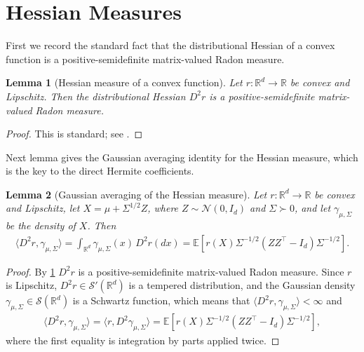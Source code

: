 \documentclass{article}
\newtheorem{lemma}[lemma]{Lemma}
\newcommand{\R}{\mathbb R}
\newcommand{\E}{\mathbb E}
\newcommand{\N}{\mathcal N}
\newcommand{\1}{\mathbf 1}
\begin{document}
\section{Hessian Measures}
First we record the standard fact that the distributional Hessian of a convex function is a positive-semidefinite matrix-valued Radon measure.
\begin{lemma}[Hessian measure of a convex function]
    \label{lem:convex-hessian-measure}
    Let $r:\R^d\to\R$ be convex and Lipschitz.
    Then the distributional Hessian $D^2r$ is a positive-semidefinite
    matrix-valued Radon measure.
\end{lemma}
\begin{proof}
    This is standard; see \citet[Section~6.3]{evansgariepy2015measure}.
\end{proof}
Next lemma gives the Gaussian averaging identity for the Hessian measure, which is the key to the direct Hermite coefficients.
\begin{lemma}[Gaussian averaging of the Hessian measure]
    \label{lem:gaussian-hessian-average}
    Let $r:\R^d\to\R$ be convex and Lipschitz, let
    $X=\mu+\Sigma^{1/2}Z$, where $Z\sim\N(0,I_d)$ and $\Sigma\succ0$, and
    let $\gamma_{\mu,\Sigma}$ be the density of $X$.  Then
    \begin{align}
        \langle D^2r,\gamma_{\mu,\Sigma}\rangle
        =
        \int_{\R^d}
        \gamma_{\mu,\Sigma}(x)\,D^2r(dx)
        =
        \E\left[
            r(X)\Sigma^{-1/2}(ZZ^\top-I_d)\Sigma^{-1/2}
            \right].
        \label{eq:gaussian-hessian-average}
    \end{align}
\end{lemma}
\begin{proof}
    By \cref{lem:convex-hessian-measure}
    $D^2r$ is a positive-semidefinite matrix-valued Radon measure.
    Since $r$ is Lipschitz, $D^2r \in \mathcal S'(\R^d)$ is a tempered distribution,
    and the Gaussian density $\gamma_{\mu,\Sigma}\in\mathcal S(\R^d)$ is a Schwartz function,
    which means that $\langle D^2r,\gamma_{\mu,\Sigma}\rangle < \infty$ and
    \begin{align}
        \langle D^2r,\gamma_{\mu,\Sigma}\rangle
        =
        \langle r,D^2\gamma_{\mu,\Sigma}\rangle
        =
        \E\left[
            r(X)\Sigma^{-1/2}(ZZ^\top-I_d)\Sigma^{-1/2}
            \right],
    \end{align}
    where the first equality is integration by parts applied twice.
\end{proof}
\end{document}
